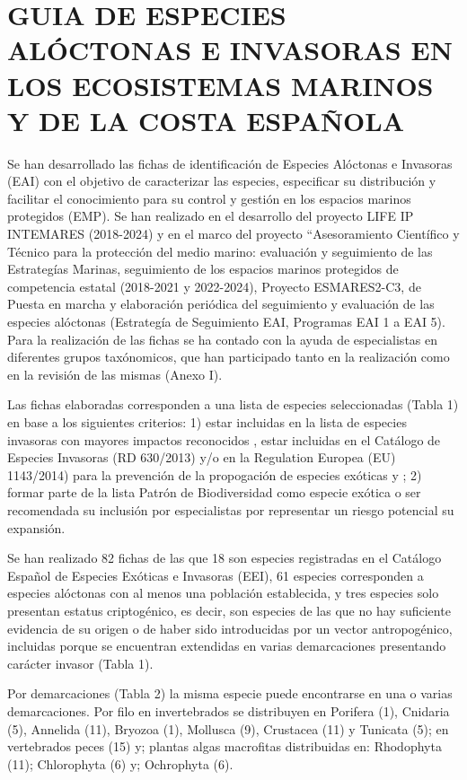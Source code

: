 \documentclass{article}
\begin{document}
\renewcommand{\listtablename}{Índice de tablas}
\renewcommand{\tablename}{Tabla}

\section*{\normalsize{GUIA DE ESPECIES ALÓCTONAS E INVASORAS EN LOS ECOSISTEMAS MARINOS Y DE LA COSTA ESPAÑOLA}}
Se han desarrollado las fichas de identificación de Especies Alóctonas e Invasoras (EAI) con el objetivo de caracterizar las especies, especificar su distribución y facilitar el conocimiento para su control y gestión en los espacios marinos protegidos (EMP). Se han realizado en el desarrollo del proyecto LIFE IP INTEMARES (2018-2024) y  en el marco del proyecto “Asesoramiento Científico y Técnico para la protección del medio marino: evaluación y seguimiento de las Estrategías Marinas, seguimiento de los espacios marinos protegidos de competencia estatal (2018-2021 y 2022-2024), Proyecto ESMARES2-C3, de Puesta en marcha y elaboración periódica del seguimiento y evaluación de las especies alóctonas (Estrategía de Seguimiento EAI, Programas EAI 1 a EAI 5). Para la realización de las fichas se ha contado con la ayuda de especialistas en diferentes grupos taxónomicos, que han participado tanto en la realización como en la revisión de las mismas (Anexo I).\par
Las fichas elaboradas corresponden a una lista de especies seleccionadas (Tabla 1) en base a los siguientes criterios: 1) estar incluidas en la lista de especies invasoras con mayores impactos reconocidos \cite{1}, estar incluidas en el Catálogo de Especies Invasoras (RD 630/2013) y/o en la Regulation Europea (EU) 1143/2014) para la prevención de la propogación de especies exóticas y ; 2) formar parte de la lista Patrón de Biodiversidad como especie exótica o ser recomendada su inclusión por  especialistas por representar un riesgo potencial su expansión.\par
Se han realizado 82 fichas de las que 18  son especies registradas en el Catálogo Español de Especies Exóticas e Invasoras (EEI), 61 especies  corresponden a especies alóctonas con al menos una población establecida, y tres especies solo presentan estatus criptogénico, es decir, son especies de las que no hay suficiente evidencia de su origen o de haber sido introducidas por un vector antropogénico, incluidas porque se encuentran extendidas en varias demarcaciones presentando carácter invasor (Tabla 1).\par 
Por demarcaciones (Tabla 2) la misma especie puede encontrarse en una o varias demarcaciones. Por filo en invertebrados se distribuyen en Porifera (1), Cnidaria (5), Annelida (11), Bryozoa (1), Mollusca (9), Crustacea (11) y Tunicata (5);  en vertebrados peces  (15) y; plantas  algas macrofitas distribuidas en: Rhodophyta (11);  Chlorophyta (6) y;  Ochrophyta (6).\par
\end{document}
